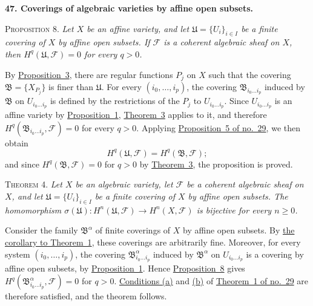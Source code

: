 
\medskip
{}\label{fac:II:3:no:47}
\textbf{47. Coverings of algebraic varieties by affine open subsets.}

\label{fac:II:3:prop:8}
\textsc{Proposition 8.} \textit{Let $X$ be an affine variety, and let
$\mathfrak{U}=\{U_i\}_{i\in I}$ be a finite covering of $X$ by affine open
subsets. If $\mathcal{F}$ is a coherent algebraic sheaf on $X$, then
$H^q(\mathfrak{U},\mathcal{F})=0$ for every $q>0$.}

By \hyperref[fac:II:3:no:42:prop:3]{Proposition~3}, there are regular functions $P_j$ on $X$ such that the
covering $\mathfrak{B}=\{X_{P_j}\}$ is finer than $\mathfrak{U}$. For every
$(i_0,\ldots,i_p)$, the covering $\mathfrak{B}_{i_0\ldots i_p}$ induced by
$\mathfrak{B}$ on $U_{i_0\ldots i_p}$ is defined by the restrictions of the
$P_j$ to $U_{i_0\ldots i_p}$. Since $U_{i_0\ldots i_p}$ is an affine variety
by \hyperref[fac:II:3:no:42:prop:1]{Proposition~1}, \hyperref[fac:II:3:no:46:thm:3]{Theorem~3} applies to it, and therefore
$H^q(\mathfrak{B}_{i_0\ldots i_p},\mathcal{F})=0$ for every $q>0$. Applying
\hyperref[fac:I:4:no:29:prop:5]{Proposition~5 of no.~29}, we then obtain
\[
H^q(\mathfrak{U},\mathcal{F})=H^q(\mathfrak{B},\mathcal{F});
\]
and since $H^q(\mathfrak{B},\mathcal{F})=0$ for $q>0$ by \hyperref[fac:II:3:no:46:thm:3]{Theorem~3}, the
proposition is proved.

\label{fac:II:3:thm:4}
\textsc{Theorem 4.} \textit{Let $X$ be an algebraic variety, let
$\mathcal{F}$ be a coherent algebraic sheaf on $X$, and let
$\mathfrak{U}=\{U_i\}_{i\in I}$ be a finite covering of $X$ by affine open
subsets. The homomorphism
$\sigma(\mathfrak{U}):H^n(\mathfrak{U},\mathcal{F})\to H^n(X,\mathcal{F})$
is bijective for every $n\geq0$.}

Consider the family $\mathfrak{B}^{\alpha}$ of finite coverings of $X$ by
affine open subsets. By \hyperref[fac:II:3:no:42:thm:1:cor]{the corollary to Theorem~1}, these coverings are
arbitrarily fine. Moreover, for every system $(i_0,\ldots,i_p)$, the covering
$\mathfrak{B}^{\alpha}_{i_0\ldots i_p}$ induced by
$\mathfrak{B}^{\alpha}$ on $U_{i_0\ldots i_p}$ is a covering by affine open
subsets, by \hyperref[fac:II:3:no:42:prop:1]{Proposition~1}. Hence \hyperref[fac:II:3:prop:8]{Proposition~8} gives
$H^q(\mathfrak{B}^{\alpha}_{i_0\ldots i_p},\mathcal{F})=0$ for $q>0$.
\hyperref[fac:I:4:no:29:thm:1:item:a]{Conditions (a)} and \hyperref[fac:I:4:no:29:thm:1:item:b]{(b)} of \hyperref[fac:I:4:no:29:thm:1]{Theorem~1 of no.~29} are therefore satisfied, and
the theorem follows.


